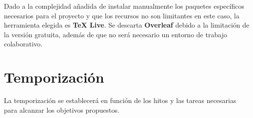 Dado a la complejidad añadida de instalar manualmente los paquetes específicos necesarios
para el proyecto y que los recursos no son limitantes en este caso, la herramienta elegida
es \textbf{TeX Live}. Se descarta \textbf{Overleaf} debido a la limitación de la versión gratuita,
además de que no será necesario un entorno de trabajo colaborativo.

\section{Temporización}
La temporización se establecerá en función de los hitos y las tareas necesarias para 
alcanzar los objetivos propuestos.